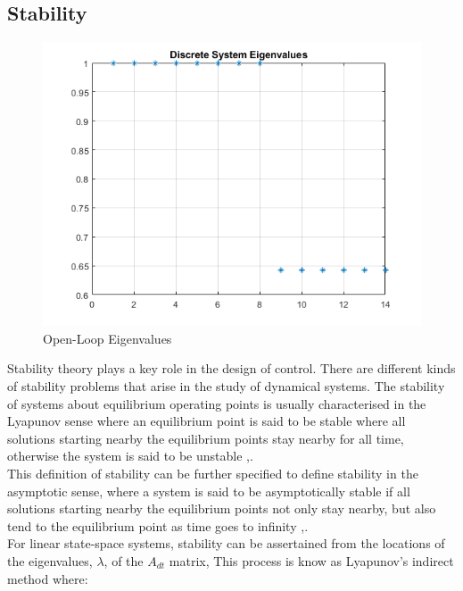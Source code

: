 \documentclass[12pt,a4paper,twoside]{report}
\begin{document}
			\subsection{Stability}
			
				\begin{figure}[h!]
					\centering
					\includegraphics[width=0.8\linewidth]{DiscreteSystemPoles.png}
					\caption{Open-Loop Eigenvalues}
					\label{fig:openloopeigenvalues}
				\end{figure}
			
				Stability theory plays a key role in the design of control. There are different kinds of stability problems that arise in the study of dynamical systems. The stability of systems about equilibrium operating points is usually characterised in the Lyapunov sense where an equilibrium point is said to be stable where all solutions starting nearby the equilibrium points stay nearby for all time, otherwise the system is said to be unstable \cite{13},\cite{18}. 
				\\
				This definition of stability can be further specified to define stability in the asymptotic sense, where a system is said to be asymptotically stable if all solutions starting nearby the equilibrium points not only stay nearby, but also tend to the equilibrium point as time goes to infinity \cite{13},\cite{18}.
				\\
				For linear state-space systems, stability can be assertained from the locations of the eigenvalues, $\lambda$, of the $A_{dt}$ matrix, This process is know as Lyapunov's indirect method \cite{13} where:
				
\end{document}
